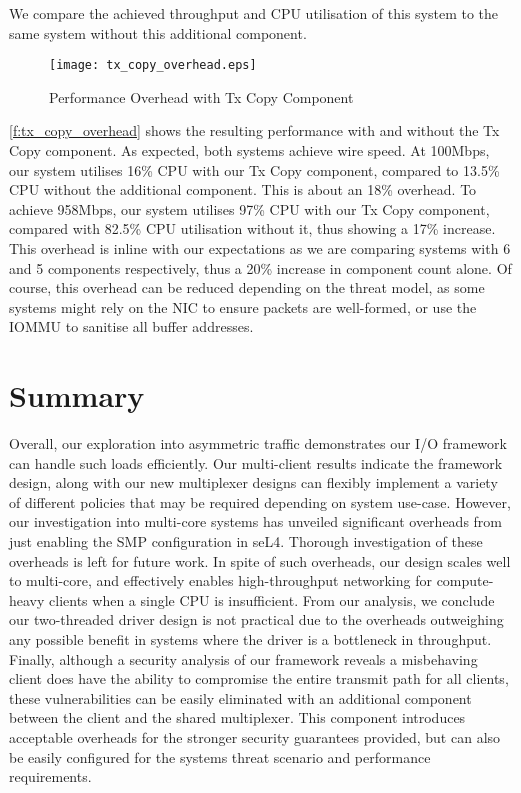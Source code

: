 We compare the achieved throughput and CPU utilisation of this system to the same system without this additional component. 

\begin{figure}[h]
    \centering
    \texttt{[image: tx\_copy\_overhead.eps]}
    \caption{Performance Overhead with Tx Copy Component}
    \label{f:tx_copy_overhead}
\end{figure}

\autoref{f:tx_copy_overhead} shows the resulting performance with and without the Tx Copy component. As expected, both
systems achieve wire speed. At 100Mbps, our system utilises 16\% CPU with our Tx Copy component, compared to 13.5\% CPU 
without the additional component. This is about an 18\% overhead. To achieve 958Mbps, our system utilises 97\% CPU with our Tx
Copy component, compared with 82.5\% CPU utilisation without it, thus showing a 17\% increase. This overhead is 
inline with our expectations as we are comparing systems with 6 and 5 components respectively, thus a 20\% increase
in component count alone. Of course, this overhead can be reduced depending on the threat model, as some systems might
rely on the NIC to ensure packets are well-formed, or use the IOMMU to sanitise all buffer addresses.  

\section{Summary}
Overall, our exploration into asymmetric traffic demonstrates our I/O framework can handle such loads efficiently. 
Our multi-client results indicate the framework design, along with our new multiplexer 
designs can flexibly implement a variety of different policies that may be required depending on system use-case. However,
our investigation into multi-core systems has unveiled significant overheads from just enabling the SMP configuration in seL4.
Thorough investigation of these overheads is left for future work. In spite of such overheads, our design scales
well to multi-core, and effectively enables high-throughput networking for compute-heavy clients when a 
single CPU is insufficient. From our analysis, we conclude our two-threaded driver design is not practical
due to the overheads outweighing any possible benefit in systems where the driver is a bottleneck in throughput. 
Finally, although a security analysis of our framework reveals a misbehaving client does have the ability to compromise
the entire transmit path for all clients, these vulnerabilities can be easily eliminated with an additional component between 
the client and the shared multiplexer. This component introduces acceptable overheads for the stronger security
guarantees provided, but can also be easily configured for the systems threat scenario and performance requirements. 

